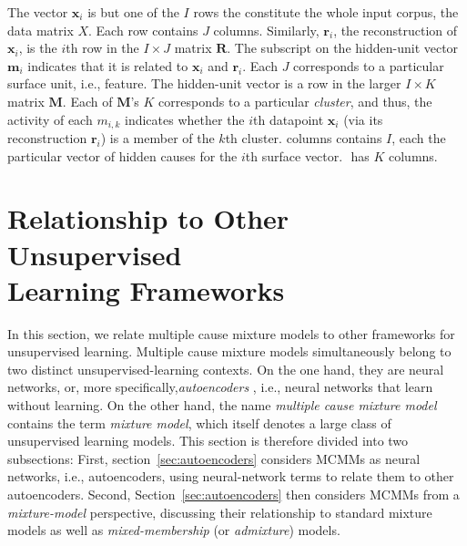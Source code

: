 The vector $\mathbf{x}_i$ is but one of the $I$ rows the constitute the whole 
input corpus, the data matrix $X$. Each row contains $J$ columns. Similarly, 
$\mathbf{r}_i$, the reconstruction of $\mathbf{x}_i$, is the $i$th row in the 
$I \times J$ matrix $\mathbf{R}$. The subscript on the hidden-unit vector 
$\mathbf{m}_i$ indicates that it is related to $\mathbf{x}_i$ and $\mathbf{r}_i$. 
Each $J$ corresponds to a particular surface unit, i.e., feature. 
The hidden-unit vector is a row in the larger $I \times K$ matrix 
$\mathbf{M}$. Each of $\mathbf{M}$'s $K$ corresponds to a particular 
\emph{cluster}, and thus, the activity of each $m_{i,k}$ indicates whether the $i$th 
datapoint $\mathbf{x}_i$ (via its reconstruction $\mathbf{r}_i$) is a member of the 
$k$th cluster.  columns contains $I$, each the particular vector of hidden causes for 
the $i$th surface vector. $\mathbf{}$ has $K$ columns.




\section{Relationship to Other Unsupervised \\ Learning Frameworks}
\label{sec:context}

In this section, we relate multiple cause mixture models to other frameworks for unsupervised learning. 
Multiple cause mixture models simultaneously belong to two distinct unsupervised-learning contexts. 
On the one hand, they are neural networks, or, more specifically,\emph{autoencoders} \citep{dayan-and-zemel:95}, 
i.e., neural networks that learn without learning. On the other hand, the name 
\emph{multiple cause mixture model} 
contains the term \emph{mixture model}, which itself denotes a large class of unsupervised learning models. 
This section is therefore divided into two subsections: First, section~\ref{sec:autoencoders} considers MCMMs as neural networks, i.e., autoencoders, using neural-network terms to relate them to other autoencoders. Second, Section~\ref{sec:autoencoders} then considers MCMMs from a \emph{mixture-model} perspective, discussing their relationship to standard mixture models as well as \emph{mixed-membership} (or \emph{admixture}) models. 

